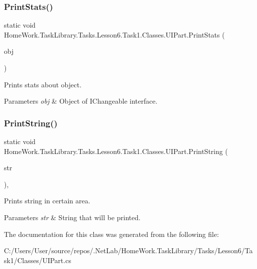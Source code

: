 \subsubsection{\texorpdfstring{PrintStats()}{PrintStats()}}
{\footnotesize\ttfamily static void Home\+Work.\+Task\+Library.\+Tasks.\+Lesson6.\+Task1.\+Classes.\+U\+I\+Part.\+Print\+Stats (\begin{DoxyParamCaption}\item[{\mbox{\hyperlink{interface_home_work_1_1_task_library_1_1_tasks_1_1_lesson6_1_1_task1_1_1_interfaces_1_1_i_changeable}{I\+Changeable}}}]{obj }\end{DoxyParamCaption})\hspace{0.3cm}{\ttfamily [static]}}



Prints stats about object. 


\begin{DoxyParams}{Parameters}
{\em obj} & Object of I\+Changeable interface.\\
\hline
\end{DoxyParams}
\mbox{\label{class_home_work_1_1_task_library_1_1_tasks_1_1_lesson6_1_1_task1_1_1_classes_1_1_u_i_part_ac320d526807cfca3c3aa7f9c63518eb7}} 
\subsubsection{\texorpdfstring{PrintString()}{PrintString()}}
{\footnotesize\ttfamily static void Home\+Work.\+Task\+Library.\+Tasks.\+Lesson6.\+Task1.\+Classes.\+U\+I\+Part.\+Print\+String (\begin{DoxyParamCaption}\item[{string}]{str }\end{DoxyParamCaption})\hspace{0.3cm}{\ttfamily [static]}, {\ttfamily [private]}}



Prints string in certain area. 


\begin{DoxyParams}{Parameters}
{\em str} & String that will be printed.\\
\hline
\end{DoxyParams}


The documentation for this class was generated from the following file\+:\begin{DoxyCompactItemize}
\item 
C\+:/\+Users/\+User/source/repos/.\+Net\+Lab/\+Home\+Work.\+Task\+Library/\+Tasks/\+Lesson6/\+Task1/\+Classes/U\+I\+Part.\+cs\end{DoxyCompactItemize}
